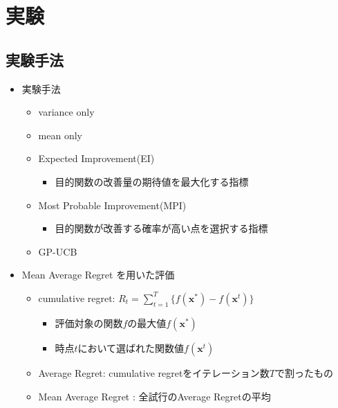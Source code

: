 \documentclass[dvipdfmx, 10.5pt]{beamer}
\begin{document}

\section{実験}



\subsection{実験手法}
\begin{frame}{\insertsubsection}
	\begin{itemize}
		\item 実験手法
		\begin{itemize}
			\vspace{5pt}
			\item variance only
			\vspace{2pt}
			\item mean only
			\vspace{2pt}
			\item Expected Improvement(EI)
			\begin{itemize}
				\item 目的関数の改善量の期待値を最大化する指標
			\end{itemize}
			\vspace{2pt}
			\item Most Probable Improvement(MPI)
			\begin{itemize}
				\item 目的関数が改善する確率が高い点を選択する指標
			\end{itemize}
			\vspace{2pt}
			\item \textcolor{myorange}{GP-UCB}
		\end{itemize}
		\vspace{15pt}
		\item \textcolor{myorange}{Mean Average Regret} を用いた評価
		\begin{itemize}
			\item cumulative regret: $R_t = \sum_{t=1}^T\{f(\bm x^*) - f(\bm x^t)\}$
			\begin{itemize}
				\vspace{1.5pt}
				\item $\mbox{評価対象の関数}f\mbox{の最大値}f(\bm x^*)$
				\vspace{1.5pt}
				\item $\mbox{時点}t\mbox{において選ばれた関数値}f(\bm x^t)$
			\end{itemize}
			\vspace{2pt}
			\item Average Regret: cumulative regretをイテレーション数$T$で割ったもの
			\vspace{2pt}
			\item \textcolor{myorange}{Mean Average Regret} : 全試行のAverage Regretの平均
		\end{itemize}
	\end{itemize}
\end{frame}
\end{document}
